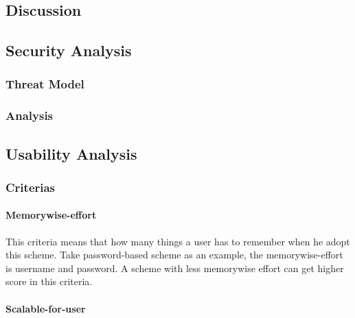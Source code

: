\begin{CJK}{Bg5}{bsmi}


\chapter{Discussion}

\section{Security Analysis}

\begin{comment}
This is the most important part of an authentication system.
We have to define our threat model before we start to analyze.
There are 4 components in the scheme I proposed.
\end{comment}

\subsection{Threat Model}

\subsection{Analysis}

\section{Usability Analysis}

\subsection{Criterias}

\subsubsection{Memorywise-effort}

This criteria means that how many things a user has to remember when he adopt this scheme. Take password-based scheme as an example, the memorywise-effort is username and password. A scheme with less memorywise effort can get higher score in this criteria.

\subsubsection{Scalable-for-user}


\end{CJK}
